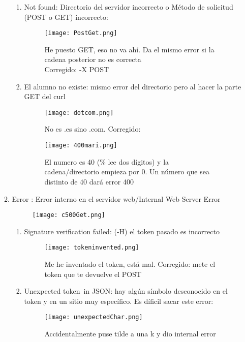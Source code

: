 \begin{enumerate}
\begin{enumerate}
\begin{enumerate}
			\item Not found: Directorio del servidor incorrecto o Método de solicitud (POST o GET) incorrecto:
			\begin{figure}[H]
				\centering
				\texttt{[image: PostGet.png]}
				\caption{He puesto GET, eso no va ahí. Da el mismo error si la cadena posterior no es correcta\\
					Corregido: -X POST}
			\end{figure}
		
			\item El alumno no existe: mismo error del directorio pero al hacer la parte GET del curl
			\begin{figure}[H]
				\centering
				\texttt{[image: dotcom.png]}
				\caption{No es .es sino .com. Corregido: }
			\end{figure}
			\begin{figure}[H]
				\centering
				\texttt{[image: 400mari.png]}
				\caption{El numero es 40 (\% lee dos dígitos) y la cadena/directorio empieza por 0. Un número que sea distinto de 40 dará error 400}
			\end{figure}
		\end{enumerate}
	
		\item Error : Error interno en el servidor web/Internal Web Server Error
		\begin{figure}[H]
			\centering
			\texttt{[image: c500Get.png]}
		\end{figure}
		
		\begin{enumerate}
			\item Signature verification failed: (-H) el token pasado es incorrecto
			\begin{figure}[H]
				\centering
				\texttt{[image: tokeninvented.png]}
				\caption{Me he inventado el token, está mal. Corregido: mete el token que te devuelve el POST}
			\end{figure}
		
			\item Unexpected token \ucr \,in JSON: hay algún símbolo desconocido en el token y en un sitio muy específico. Es díficil sacar este error:
			\begin{figure}[H]
				\centering
				\texttt{[image: unexpectedChar.png]}
				\caption{Accidentalmente puse tilde a una k y dio internal error}
			\end{figure}
		\end{enumerate}
	\end{enumerate}


\end{enumerate}
